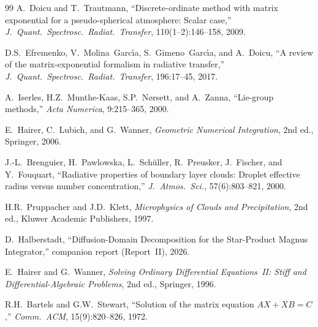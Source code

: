 \documentclass[11pt,a4paper]{article}
\theoremstyle{definition}
\begin{document}
\begin{thebibliography}{99}
A.~Doicu and T.~Trautmann, ``Discrete-ordinate method with matrix
exponential for a pseudo-spherical atmosphere: Scalar case,''
\emph{J.\ Quant.\ Spectrosc.\ Radiat.\ Transfer},
110(1--2):146--158, 2009.

D.S.~Efremenko, V.~Molina~Garc\'\i a, S.~Gimeno~Garc\'\i a, and
A.~Doicu, ``A review of the matrix-exponential formalism in radiative
transfer,'' \emph{J.\ Quant.\ Spectrosc.\ Radiat.\ Transfer},
196:17--45, 2017.

A.~Iserles, H.Z.~Munthe-Kaas, S.P.~N\o rsett, and A.~Zanna,
``Lie-group methods,'' \emph{Acta Numerica}, 9:215--365, 2000.

E.~Hairer, C.~Lubich, and G.~Wanner, \emph{Geometric Numerical
Integration}, 2nd ed., Springer, 2006.

J.-L.~Brenguier, H.~Pawlowska, L.~Sch\"uller, R.~Preusker,
J.~Fischer, and Y.~Fouquart, ``Radiative properties of boundary layer
clouds: Droplet effective radius versus number concentration,''
\emph{J.\ Atmos.\ Sci.}, 57(6):803--821, 2000.

H.R.~Pruppacher and J.D.~Klett, \emph{Microphysics of Clouds and
Precipitation}, 2nd ed., Kluwer Academic Publishers, 1997.

D.~Halberstadt, ``Diffusion-Domain Decomposition for the Star-Product
Magnus Integrator,'' companion report (Report~II), 2026.

E.~Hairer and G.~Wanner, \emph{Solving Ordinary Differential
Equations~II: Stiff and Differential-Algebraic Problems}, 2nd ed.,
Springer, 1996.

R.H.~Bartels and G.W.~Stewart, ``Solution of the matrix equation
$AX+XB=C$,'' \emph{Comm.\ ACM}, 15(9):820--826, 1972.

\end{thebibliography}
\end{document}
